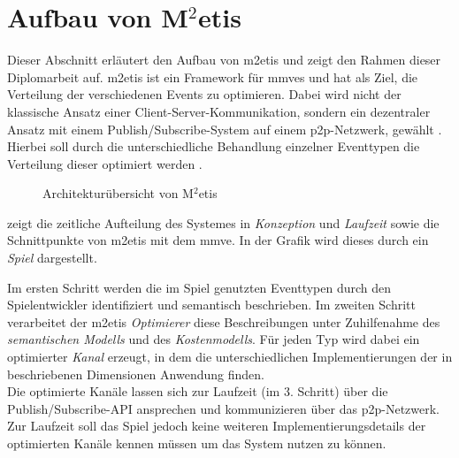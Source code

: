 \section{Aufbau von M$^2$etis}
\label{chap:aufbau_metis}

Dieser Abschnitt erläutert den Aufbau von \ac{m2etis}  und zeigt den Rahmen dieser Diplomarbeit auf. \ac{m2etis} ist ein Framework für \acp{mmve} und hat als Ziel, die Verteilung der verschiedenen Events zu optimieren. Dabei wird nicht der klassische Ansatz einer Client-Server-Kommunikation, sondern ein dezentraler Ansatz mit einem Publish/Subscribe-System auf einem \ac{p2p}-Netzwerk, gewählt \cite{Fischer2010a}. Hierbei soll durch die unterschiedliche Behandlung einzelner Eventtypen die Verteilung dieser optimiert werden \cite{Fischer2010Event}.

\begin{figure}[htbp]
\centering
{}
\caption{Architekturübersicht von M$^2$etis}
\label{fig:metis_aufbau}
\end{figure}

 zeigt die zeitliche Aufteilung des Systemes in \emph{Konzeption} und \emph{Laufzeit} sowie die Schnittpunkte von \ac{m2etis} mit dem \ac{mmve}. In der Grafik wird dieses durch ein \emph{Spiel} dargestellt.

Im ersten Schritt werden die im Spiel genutzten Eventtypen durch den Spielentwickler identifiziert und semantisch beschrieben. Im zweiten Schritt verarbeitet der \ac{m2etis} \emph{Optimierer} diese Beschreibungen unter Zuhilfenahme des \emph{semantischen Modells} und des \emph{Kostenmodells}. Für jeden Typ wird dabei ein optimierter \emph{Kanal} erzeugt, in dem die unterschiedlichen Implementierungen der in \cite{Fischer2010a} beschriebenen Dimensionen Anwendung finden.\\
Die optimierte Kanäle lassen sich zur Laufzeit (im 3. Schritt) über die Publish/Subscribe-API ansprechen und kommunizieren über das \ac{p2p}-Netzwerk. Zur Laufzeit soll das Spiel jedoch keine weiteren Implementierungsdetails der optimierten Kanäle kennen müssen um das System nutzen zu können.

